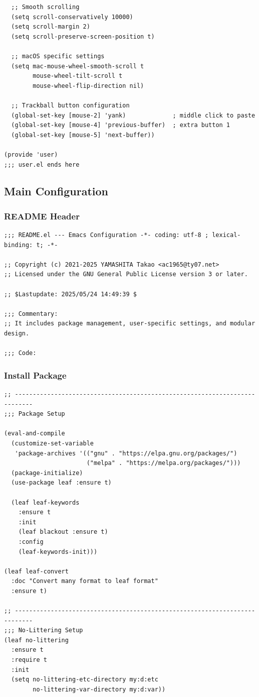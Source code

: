 \documentclass[11pt]{article}
\begin{document}
\begin{verbatim}
  ;; Smooth scrolling
  (setq scroll-conservatively 10000)
  (setq scroll-margin 2)
  (setq scroll-preserve-screen-position t)

  ;; macOS specific settings
  (setq mac-mouse-wheel-smooth-scroll t
        mouse-wheel-tilt-scroll t
        mouse-wheel-flip-direction nil)

  ;; Trackball button configuration
  (global-set-key [mouse-2] 'yank)             ; middle click to paste
  (global-set-key [mouse-4] 'previous-buffer)  ; extra button 1
  (global-set-key [mouse-5] 'next-buffer))

(provide 'user)
;;; user.el ends here
\end{verbatim}
\subsection{Main Configuration}
\label{sec:orgae0d305}
\subsubsection{README Header}
\label{sec:orga2838bf}

\begin{verbatim}
;;; README.el --- Emacs Configuration -*- coding: utf-8 ; lexical-binding: t; -*-

;; Copyright (c) 2021-2025 YAMASHITA Takao <ac1965@ty07.net>
;; Licensed under the GNU General Public License version 3 or later.

;; $Lastupdate: 2025/05/24 14:49:39 $

;;; Commentary:
;; It includes package management, user-specific settings, and modular design.

;;; Code:
\end{verbatim}
\subsubsection{Install Package}
\label{sec:org6bc9d45}

\begin{verbatim}
;; ---------------------------------------------------------------------------
;;; Package Setup

(eval-and-compile
  (customize-set-variable
   'package-archives '(("gnu" . "https://elpa.gnu.org/packages/")
                       ("melpa" . "https://melpa.org/packages/")))
  (package-initialize)
  (use-package leaf :ensure t)

  (leaf leaf-keywords
    :ensure t
    :init
    (leaf blackout :ensure t)
    :config
    (leaf-keywords-init)))

(leaf leaf-convert
  :doc "Convert many format to leaf format"
  :ensure t)

;; ---------------------------------------------------------------------------
;;; No-Littering Setup
(leaf no-littering
  :ensure t
  :require t
  :init
  (setq no-littering-etc-directory my:d:etc
        no-littering-var-directory my:d:var))
\end{verbatim}
\end{document}
